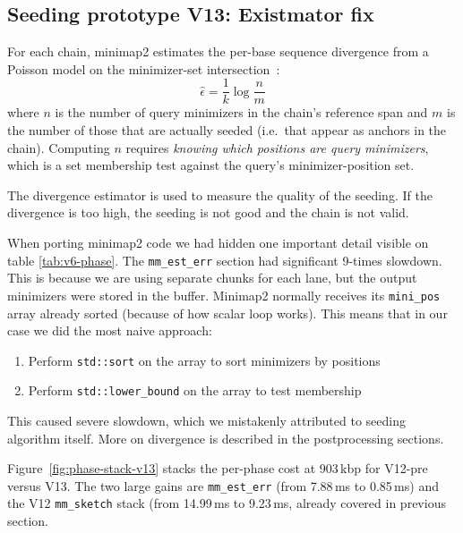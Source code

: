 \subsection{Seeding prototype V13: Existmator fix}
\label{sec:minimizer-divergence-history}

For each chain, minimap2 estimates the per-base sequence divergence
from a Poisson model on the minimizer-set
intersection~\cite{minimap2_paper}:
\[
\hat{\epsilon} = \frac{1}{k} \log \frac{n}{m}
\]
where $n$ is the number of query minimizers in the chain's reference
span and $m$ is the number of those that are actually seeded
(i.e.\ that appear as anchors in the chain).  Computing $n$ requires
\emph{knowing which positions are query minimizers}, which is a set
membership test against the query's minimizer-position set.

The divergence estimator is used to measure the quality of the seeding. If the divergence is too high, the seeding is not good and the chain is not valid.

When porting minimap2 code we had hidden one important detail visible on table \ref{tab:v6-phase}. The \texttt{mm\_est\_err} section had significant 9-times slowdown. This is because we are using separate chunks for each lane, but the output minimizers were stored in the buffer.
Minimap2 normally receives its \texttt{mini\_pos} array already sorted (because of how scalar loop works). This means that in our case we did the most naive approach:
\begin{enumerate}
\item Perform \texttt{std::sort} on the array to sort minimizers by positions
\item Perform \texttt{std::lower\_bound} on the array to test membership
\end{enumerate}

This caused severe slowdown, which we mistakenly attributed to seeding algorithm itself. More on divergence is described in the postprocessing sections.

Figure~\ref{fig:phase-stack-v13} stacks the per-phase cost at
903\,kbp for V12-pre versus V13.  The two large gains are
\texttt{mm\_est\_err} (from 7.88\,ms to 0.85\,ms) and the V12
\texttt{mm\_sketch} stack (from 14.99\,ms to 9.23\,ms, already
covered in previous section.

